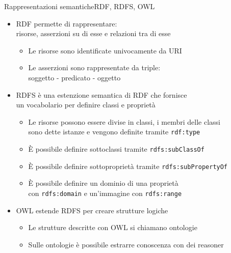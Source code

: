 \documentclass[dvips, 11pt]{beamer}
\begin{document}
\begin{frame}{Rappresentazioni semantiche}{RDF, RDFS, OWL}
  \begin{itemize}
  \item \alert{RDF} permette di rappresentare:\\
    \alert{risorse}, \alert{asserzioni} su di esse e relazioni tra di esse
    \pause
    \begin{itemize}
    \item Le risorse sono identificate univocamente da \alert{URI}
      \pause
    \item Le asserzioni sono rappresentate da \alert{triple}:\\
      \alert{soggetto} - \alert{predicato} - \alert{oggetto}
      \pause  
    \end{itemize}
  \item \alert{RDFS} \`e una estenzione semantica di RDF che fornisce\\
    un vocabolario per definire \alert{classi} e \alert{propriet\`a}
    \pause
    \begin{itemize}
    \item Le risorse possono essere divise in classi, i membri delle classi\\
      sono dette \alert{istanze} e vengono definite tramite \texttt{rdf:type}
      \pause
    \item \`E possibile definire \alert{sottoclassi} tramite \texttt{rdfs:subClassOf}
      \pause
    \item \`E possibile definire \alert{sottopropriet\`a} tramite \texttt{rdfs:subPropertyOf}
      \pause
    \item \`E possibile definire un \alert{dominio} di una propriet\`a\\
      con \texttt{rdfs:domain} e un'\alert{immagine} con \texttt{rdfs:range}
      \pause
    \end{itemize}
  \item \alert{OWL} estende RDFS per creare strutture logiche
    \pause
    \begin{itemize}
    \item Le strutture descritte con OWL si chiamano \alert{ontologie}
      \pause
    \item Sulle ontologie \`e possibile estrarre conoscenza con dei \alert{reasoner}
    \end{itemize}
  \end{itemize}
\end{frame}
\end{document}
